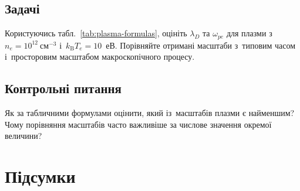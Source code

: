 

\section*{Задачі}

\begin{problem}\label{prb:PlasmaFormulaCheck}
Користуючись табл.~\ref{tab:plasma-formulas}, оцініть $\lambda_D$ та $\omega_{pe}$ для
плазми з~$n_e=10^{12}~\mathrm{см}^{-3}$ і~$k_{\mathrm B}T_e=10$~еВ.
Порівняйте отримані масштаби з~типовим часом і~просторовим масштабом макроскопічного процесу.
\end{problem}

\section*{Контрольні питання}

\begin{Questions}
\begin{quizlist}
\item Як за табличними формулами оцінити, який із~масштабів плазми є найменшим?
Чому порівняння масштабів часто важливіше за числове значення окремої величини?

\end{quizlist}
\end{Questions}

\chapter*{Підсумки}




